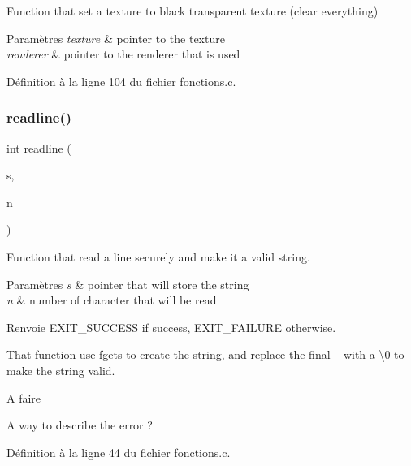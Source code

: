 Function that set a texture to black transparent texture (clear everything) 


\begin{DoxyParams}{Paramètres}
{\em texture} & pointer to the texture \\
\hline
{\em renderer} & pointer to the renderer that is used \\
\hline
\end{DoxyParams}


Définition à la ligne 104 du fichier fonctions.\+c.

\mbox{\label{fonctions_8h_afe286242e48f523265fd5fcdae3f7358}} 
\subsubsection{readline()}
{\footnotesize\ttfamily int readline (\begin{DoxyParamCaption}\item[{char $\ast$}]{s,  }\item[{int}]{n }\end{DoxyParamCaption})}



Function that read a line securely and make it a valid string. 


\begin{DoxyParams}{Paramètres}
{\em s} & pointer that will store the string \\
\hline
{\em n} & number of character that will be read \\
\hline
\end{DoxyParams}
\begin{DoxyReturn}{Renvoie}
E\+X\+I\+T\+\_\+\+S\+U\+C\+C\+E\+SS if success, E\+X\+I\+T\+\_\+\+F\+A\+I\+L\+U\+RE otherwise.
\end{DoxyReturn}
That function use fgets to create the string, and replace the final \textquotesingle{}~\newline
\textquotesingle{} with a \textquotesingle{}\textbackslash{}0\textquotesingle{} to make the string valid. \begin{DoxyRefDesc}{A faire}
\item[\textbf{ A faire}]A way to describe the error ? \end{DoxyRefDesc}


Définition à la ligne 44 du fichier fonctions.\+c.

